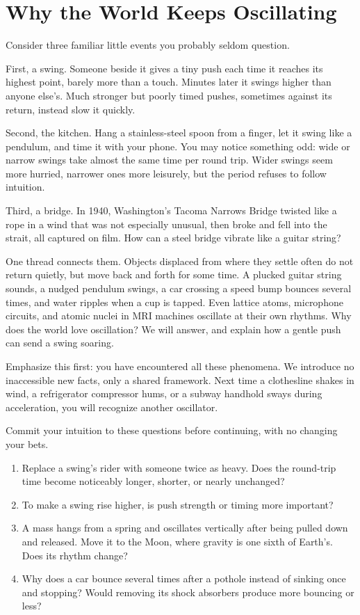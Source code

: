 \chapter{Why the World Keeps Oscillating}


Consider three familiar little events you probably seldom question.

First, a swing. Someone beside it gives a tiny push each time it reaches its highest point, barely more than a touch. Minutes later it swings higher than anyone else's. Much stronger but poorly timed pushes, sometimes against its return, instead slow it quickly.

Second, the kitchen. Hang a stainless-steel spoon from a finger, let it swing like a pendulum, and time it with your phone. You may notice something odd: wide or narrow swings take almost the same time per round trip. Wider swings seem more hurried, narrower ones more leisurely, but the period refuses to follow intuition.

Third, a bridge. In 1940, Washington's Tacoma Narrows Bridge twisted like a rope in a wind that was not especially unusual, then broke and fell into the strait, all captured on film. How can a steel bridge vibrate like a guitar string?

One thread connects them. Objects displaced from where they settle often do not return quietly, but move back and forth for some time. A plucked guitar string sounds, a nudged pendulum swings, a car crossing a speed bump bounces several times, and water ripples when a cup is tapped. Even lattice atoms, microphone circuits, and atomic nuclei in MRI machines oscillate at their own rhythms. Why does the world love oscillation? We will answer, and explain how a gentle push can send a swing soaring.

Emphasize this first: you have encountered all these phenomena. We introduce no inaccessible new facts, only a shared framework. Next time a clothesline shakes in wind, a refrigerator compressor hums, or a subway handhold sways during acceleration, you will recognize another oscillator.


Commit your intuition to these questions before continuing, with no changing your bets.

\begin{enumerate}[leftmargin=2em]
  \item Replace a swing's rider with someone twice as heavy. Does the round-trip time become noticeably longer, shorter, or nearly unchanged?
  \item To make a swing rise higher, is push strength or timing more important?
  \item A mass hangs from a spring and oscillates vertically after being pulled down and released. Move it to the Moon, where gravity is one sixth of Earth's. Does its rhythm change?
  \item Why does a car bounce several times after a pothole instead of sinking once and stopping? Would removing its shock absorbers produce more bouncing or less?
\end{enumerate}

